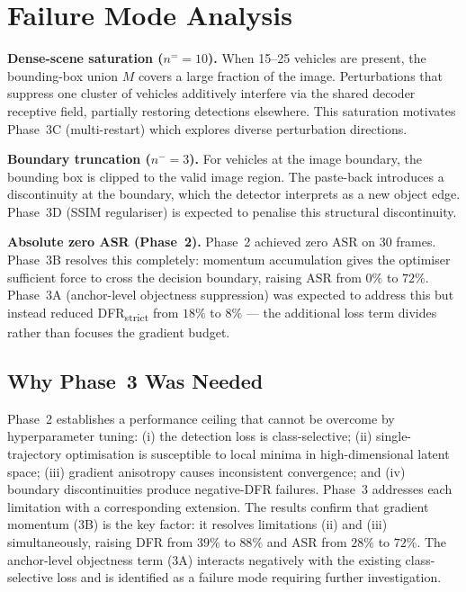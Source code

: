 \documentclass[12pt,a4paper]{report}
\begin{document}
\section{Failure Mode Analysis}
\label{sec:failure}

\textbf{Dense-scene saturation ($n^= = 10$).}
When 15--25 vehicles are present, the bounding-box union $M$ covers a large fraction
of the image. Perturbations that suppress one cluster of vehicles additively interfere
via the shared decoder receptive field, partially restoring detections elsewhere.
This saturation motivates Phase~3C (multi-restart) which explores diverse perturbation
directions.

\textbf{Boundary truncation ($n^- = 3$).}
For vehicles at the image boundary, the bounding box is clipped to the valid image
region. The paste-back introduces a discontinuity at the boundary, which the detector
interprets as a new object edge. Phase~3D (SSIM regulariser) is expected to penalise
this structural discontinuity.

\textbf{Absolute zero ASR (Phase~2).}
Phase~2 achieved zero ASR on 30 frames. Phase~3B resolves this completely: momentum
accumulation gives the optimiser sufficient force to cross the decision boundary,
raising ASR from $0\%$ to $72\%$. Phase~3A (anchor-level objectness suppression)
was expected to address this but instead reduced DFR\textsubscript{strict}
from $18\%$ to $8\%$ — the additional loss term divides rather than focuses
the gradient budget.

\subsection{Why Phase~3 Was Needed}
\label{sec:phase3_motivation}

Phase~2 establishes a performance ceiling that cannot be overcome by hyperparameter
tuning: (i) the detection loss is class-selective; (ii) single-trajectory optimisation
is susceptible to local minima in high-dimensional latent space; (iii) gradient
anisotropy causes inconsistent convergence; and (iv) boundary discontinuities produce
negative-DFR failures. Phase~3 addresses each limitation with a corresponding
extension. The results confirm that gradient momentum (3B) is the key factor:
it resolves limitations (ii) and (iii) simultaneously, raising DFR from $39\%$
to $88\%$ and ASR from $28\%$ to $72\%$. The anchor-level objectness term (3A)
interacts negatively with the existing class-selective loss and is identified as
a failure mode requiring further investigation.
\end{document}
